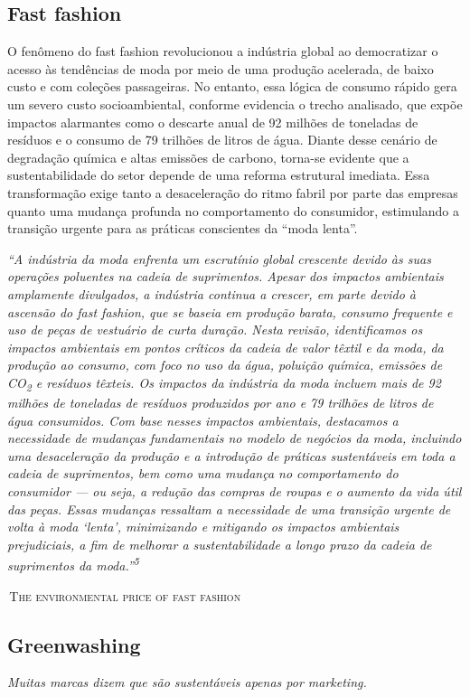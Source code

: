 \documentclass[12pt, a4paper]{article}
\newenvironment{citacaoBox}{%
  \par\vspace{6pt}%
  \def\FrameCommand{{\color{oliveSoft}\vrule width 2pt}\hspace{12pt}}%
  \MakeFramed{\advance\hsize-\width\FrameRestore}%
  \small\itshape\color{ink}%
}{%
  \par\endMakeFramed\vspace{6pt}%
}
\newcommand{\citacaoDestaque}[2]{%
  \begin{citacaoBox}#1\par\vspace{4pt}%
    {\normalfont\footnotesize\color{slate}\hfill\textsc{\textemdash{}\,#2}}%
  \end{citacaoBox}%
}
\begin{document}
\subsection{Fast fashion}
O fenômeno do fast fashion revolucionou a indústria global ao democratizar o acesso às tendências de moda por meio de uma produção acelerada, de baixo custo e com coleções passageiras. No entanto, essa lógica de consumo rápido gera um severo custo socioambiental, conforme evidencia o trecho analisado, que expõe impactos alarmantes como o descarte anual de 92 milhões de toneladas de resíduos e o consumo de 79 trilhões de litros de água. Diante desse cenário de degradação química e altas emissões de carbono, torna-se evidente que a sustentabilidade do setor depende de uma reforma estrutural imediata. Essa transformação exige tanto a desaceleração do ritmo fabril por parte das empresas quanto uma mudança profunda no comportamento do consumidor, estimulando a transição urgente para as práticas conscientes da ``moda lenta''.

\citacaoDestaque{``A indústria da moda enfrenta um escrutínio global crescente devido às suas operações poluentes na cadeia de suprimentos. Apesar dos impactos ambientais amplamente divulgados, a indústria continua a crescer, em parte devido à ascensão do fast fashion, que se baseia em produção barata, consumo frequente e uso de peças de vestuário de curta duração. Nesta revisão, identificamos os impactos ambientais em pontos críticos da cadeia de valor têxtil e da moda, da produção ao consumo, com foco no uso da água, poluição química, emissões de CO\textsubscript{2} e resíduos têxteis. Os impactos da indústria da moda incluem mais de 92 milhões de toneladas de resíduos produzidos por ano e 79 trilhões de litros de água consumidos. Com base nesses impactos ambientais, destacamos a necessidade de mudanças fundamentais no modelo de negócios da moda, incluindo uma desaceleração da produção e a introdução de práticas sustentáveis em toda a cadeia de suprimentos, bem como uma mudança no comportamento do consumidor --- ou seja, a redução das compras de roupas e o aumento da vida útil das peças. Essas mudanças ressaltam a necessidade de uma transição urgente de volta à moda `lenta', minimizando e mitigando os impactos ambientais prejudiciais, a fim de melhorar a sustentabilidade a longo prazo da cadeia de suprimentos da moda.''\textsuperscript{5}}{The environmental price of fast fashion}

\subsection{Greenwashing}
\textit{Muitas marcas dizem que são sustentáveis apenas por marketing.}
\end{document}
